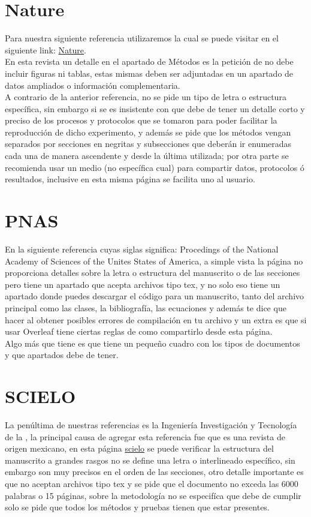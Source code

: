 \documentclass{article}
\theoremstyle{mytheoremstyle}
\theoremstyle{mytheoremstyle}
\theoremstyle{myproblemstyle}
\begin{document}
    \section*{Nature}
    Para nuestra siguiente referencia utilizaremos \cite{nature} la cual se puede visitar en el siguiente link: 
    \href{https://www.nature.com/nature/for-authors/formatting-guide}{Nature}.
    \\ En esta revista un detalle en el apartado de Métodos es la petición de no debe incluir figuras ni tablas, 
    estas mismas deben ser adjuntadas en un apartado de datos ampliados o información complementaria. \\
    A contrario de la anterior referencia, no se pide un tipo de letra o estructura específica, sin embargo si se 
    es insistente con que debe de tener un detalle corto y preciso de los procesos y protocolos que se tomaron 
    para poder facilitar la reproducción de dicho experimento, y además se pide que los métodos vengan separados 
    por secciones en negritas y subsecciones que deberán ir enumeradas cada una de manera ascendente y desde la 
    última utilizada; por otra parte se recomienda usar un medio (no específica cual) para compartir datos, protocolos 
    ó resultados, inclusive en esta misma página se facilita uno al usuario.
    \section*{PNAS}
    En la siguiente referencia \cite{PNAS} cuyas siglas significa: Procedings of the National Academy of Sciences of
    the Unites States of America, a simple vista la página no proporciona detalles sobre la letra o estructura del 
    manuscrito o de las secciones pero tiene un apartado que acepta archivos tipo tex, y no solo eso tiene un apartado 
    donde puedes descargar el código  para un manuscrito, tanto del archivo principal como las clases, la bibliografía, 
    las ecuaciones y además te dice que hacer al obtener posibles errores de compilación en tu archivo y un extra es 
    que si usar Overleaf tiene ciertas reglas de como compartirlo desde esta página. \\
    Algo más que tiene es que tiene un pequeño cuadro con los tipos de documentos y que apartados debe de tener. 
    \section*{SCIELO}
    La penúltima de nuestras referencias es la Ingeniería Investigación y Tecnología de la  \cite{scielo}, la principal causa de 
    agregar esta referencia fue que es una revista de origen mexicano, en esta página 
    \href{http://www.scielo.org.mx/revistas/iit/einstruc.htm}{scielo}  se puede verificar la estructura del manuscrito
    a grandes rasgos no se define una letra o interlineado específico, sin embargo son muy precisos en el orden de las 
    secciones, otro detalle importante es que no aceptan archivos tipo tex y se pide que el documento no exceda las 
    6000 palabras o 15 páginas, sobre la metodología no se especifíca que debe de cumplir solo se pide que todos los
    métodos y pruebas tienen que estar presentes.
\end{document}
